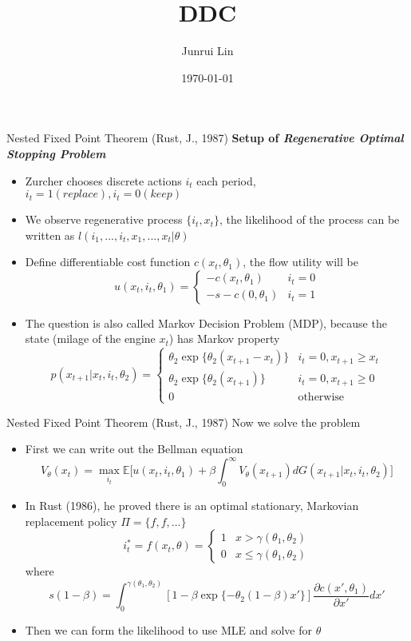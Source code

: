 \documentclass[10pt]{beamer}
\title[NYU MSQE]{DDC}
\author[Junrui Lin]{Junrui Lin}
\institute[jl12680]{NYU MSQE}
\date[\textcolor{white}{\today} ]
{\today}
\begin{document}
\frame{\titlepage}


\begin{frame}{Nested Fixed Point Theorem (Rust, J., 1987)}
\textbf{Setup of \textit{Regenerative Optimal Stopping Problem}}
\begin{itemize}
\item Zurcher chooses discrete actions $i_t$ each period, $i_t = 1(replace), i_t = 0(keep)$
\item We observe regenerative process $\{i_t,x_t\}$, the likelihood of the process can be written as $l(i_1,...,i_t,x_1,...,x_t|\theta)$ 
\item Define differentiable cost function $c(x_t,\theta_1)$, the flow utility will be
\begin{equation*}
u(x_t,i_t,\theta_1)=\begin{cases}
	-c(x_t,\theta_1) & i_t = 0 \\
	-s-c(0,\theta_1) & i_t = 1
\end{cases}	
\end{equation*}
\item The question is also called Markov Decision Problem (MDP), because the state (milage of the engine $x_t$) has Markov property
\begin{equation*}
p(x_{t+1}|x_t,i_t,\theta_2)=\begin{cases}
	\theta_2\exp\{\theta_2(x_{t+1}-x_t)\} & i_t = 0, x_{t+1}\geq x_t\\
	\theta_2\exp\{\theta_2(x_{t+1})\} & i_t = 0, x_{t+1}\geq 0\\
	0 &\text{otherwise}
\end{cases}	
\end{equation*}
\end{itemize}
\end{frame}





\begin{frame}{Nested Fixed Point Theorem (Rust, J., 1987)}
Now we solve the problem
\begin{itemize}
\item First we can write out the Bellman equation
$$V_\theta(x_t)=\max_{i_t}\mathbb{E}\bigg[u(x_t,i_t,\theta_1)+\beta \int_0^\infty V_\theta(x_{t+1})d G(x_{t+1}|x_t,i_t,\theta_2)\bigg]$$
\item In Rust (1986), he proved there is an optimal stationary, Markovian replacement policy $\Pi = \{f,f,...\}$
\begin{equation*}
i_t^*=f(x_t,\theta)=\begin{cases}
	1 & x>\gamma(\theta_1,\theta_2)\\
	0 & x\leq\gamma(\theta_1,\theta_2)
\end{cases}	
\end{equation*}
where
$$s(1-\beta)=\int_0^{\gamma(\theta_1,\theta_2)}[1-\beta\exp\{-\theta_2(1-\beta) x'\}]\frac{\partial c(x',\theta_1)}{\partial x'}dx'$$
 \item Then we can form the likelihood to use MLE and solve for $\theta$
\end{itemize}
\end{frame}
\end{document}
